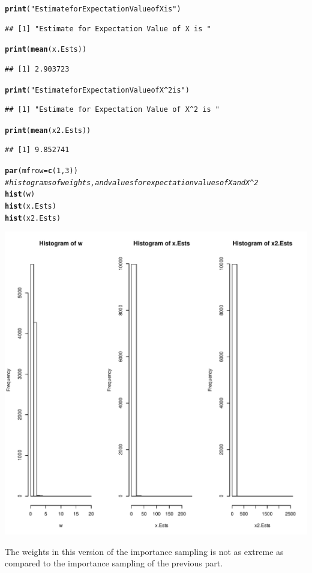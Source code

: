 \documentclass{article}\usepackage[]{graphicx}\usepackage[]{color}
\makeatletter
\def\maxwidth{ %
  \ifdim\Gin@nat@width>\linewidth
    \linewidth
  \else
    \Gin@nat@width
  \fi
}
\newcommand{\hlnum}[1]{\textcolor[rgb]{0.686,0.059,0.569}{#1}}%
\newcommand{\hlstr}[1]{\textcolor[rgb]{0.192,0.494,0.8}{#1}}%
\newcommand{\hlcom}[1]{\textcolor[rgb]{0.678,0.584,0.686}{\textit{#1}}}%
\newcommand{\hlstd}[1]{\textcolor[rgb]{0.345,0.345,0.345}{#1}}%
\newcommand{\hlkwc}[1]{\textcolor[rgb]{0.333,0.667,0.333}{#1}}%
\newcommand{\hlkwd}[1]{\textcolor[rgb]{0.737,0.353,0.396}{\textbf{#1}}}%
\newenvironment{kframe}{%
 \def\at@end@of@kframe{}%
 \ifinner\ifhmode%
  \def\at@end@of@kframe{\end{minipage}}%
  \begin{minipage}{\columnwidth}%
 \fi\fi%
 \def\FrameCommand##1{\hskip\@totalleftmargin \hskip-\fboxsep
 \colorbox{shadecolor}{##1}\hskip-\fboxsep
     \hskip-\linewidth \hskip-\@totalleftmargin \hskip\columnwidth}%
 \MakeFramed {\advance\hsize-\width
   \@totalleftmargin\z@ \linewidth\hsize
   \@setminipage}}%
 {\par\unskip\endMakeFramed%
 \at@end@of@kframe}
\newenvironment{knitrout}{}{} %
\makeatother
\begin{document}
\begin{knitrout}
\begin{kframe}
\begin{alltt}
\hlkwd{print}\hlstd{(}\hlstr{"Estimate for Expectation Value of X is "}\hlstd{)}
\end{alltt}
\begin{verbatim}
## [1] "Estimate for Expectation Value of X is "
\end{verbatim}
\begin{alltt}
\hlkwd{print}\hlstd{(}\hlkwd{mean}\hlstd{(x.Ests))}
\end{alltt}
\begin{verbatim}
## [1] 2.903723
\end{verbatim}
\begin{alltt}
\hlkwd{print}\hlstd{(}\hlstr{"Estimate for Expectation Value of X^2 is "}\hlstd{)}
\end{alltt}
\begin{verbatim}
## [1] "Estimate for Expectation Value of X^2 is "
\end{verbatim}
\begin{alltt}
\hlkwd{print}\hlstd{(}\hlkwd{mean}\hlstd{(x2.Ests))}
\end{alltt}
\begin{verbatim}
## [1] 9.852741
\end{verbatim}
\begin{alltt}
\hlkwd{par}\hlstd{(}\hlkwc{mfrow}\hlstd{=}\hlkwd{c}\hlstd{(}\hlnum{1}\hlstd{,}\hlnum{3}\hlstd{))}
\hlcom{#histograms of weights, and values for expectation values of X and X^2}
\hlkwd{hist}\hlstd{(w)}
\hlkwd{hist}\hlstd{(x.Ests)}
\hlkwd{hist}\hlstd{(x2.Ests)}
\end{alltt}
\end{kframe}
\includegraphics[width=\maxwidth]{figure/unnamed-chunk-3-1} 

\end{knitrout}
The weights in this version of the importance sampling is not as extreme as compared to the importance sampling of the previous part.
\end{document}

